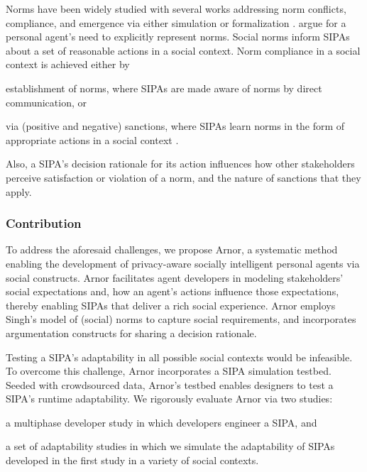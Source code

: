 \documentclass[11pt,          %
               phd,           %
               onehalfspacing %
               ]{ncsuthesis}
\newcommand{\frameworkA}{Arnor\xspace}
\begin{document}
Norms have been widely studied with several works addressing norm
conflicts, compliance, and emergence via either simulation or
formalization \citep{Alechina+16:monitoring,Criado-IJCAI16-Selective}.
 argue for a personal
agent's need to explicitly represent norms. Social norms inform SIPAs
about a set of reasonable actions in a social context. Norm compliance
in a social context is achieved either by
%
\begin{enumerate*}[label=(\arabic*)]
\item establishment of norms, where SIPAs are made aware of norms by 
direct communication, or
\item via (positive and negative) sanctions, where SIPAs learn norms in 
the form of appropriate actions in a social context 
\citep{Andrighetto-2013-PunishVoice}.
\end{enumerate*}
%
Also, a SIPA's decision rationale for its action influences
how other stakeholders perceive satisfaction or violation of a norm, and 
the nature of sanctions that they apply. 

\subsubsection*{Contribution} 
To address the aforesaid challenges, we propose \frameworkA, a systematic 
method enabling the development of privacy-aware socially intelligent personal 
agents via social constructs.  \frameworkA facilitates agent developers in modeling
stakeholders' social expectations and, how an agent's actions influence 
those expectations, thereby enabling SIPAs that deliver a rich
social experience.  
\frameworkA employs Singh's \citeyearpar{Singh-2013-Norms} model of (social)
norms to capture social requirements, and incorporates argumentation
constructs \citep{BenchCapon-2007-Argumentation+AI} for
sharing a decision rationale.

Testing a SIPA's adaptability in all possible social contexts would be infeasible. 
To overcome this challenge, \frameworkA incorporates a SIPA simulation testbed. 
Seeded with crowdsourced data, \frameworkA's testbed enables designers to test a
SIPA's runtime adaptability.
We rigorously evaluate \frameworkA via two studies:
\begin{enumerate*}[label=(\arabic*)]
\item a multiphase developer study in which developers engineer a SIPA,
and
\item a set of adaptability studies in which we simulate the
adaptability of SIPAs developed in the first study in a variety of
social contexts. \end{enumerate*}
\end{document}
